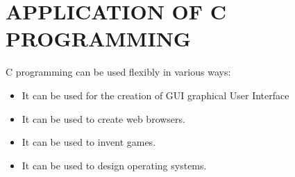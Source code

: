 \documentclass{article}
\begin{document}
	\section*{APPLICATION OF C PROGRAMMING}
	C programming can be used flexibly in various ways:
	\begin{itemize}
		\item It can be used for the creation of GUI{ graphical User Interface}
		\item It can be used to create web browsers.
		\item It can be used to invent games.
		\item It can be used to design operating systems.
		
		
	\end{itemize}
	
\end{document}
